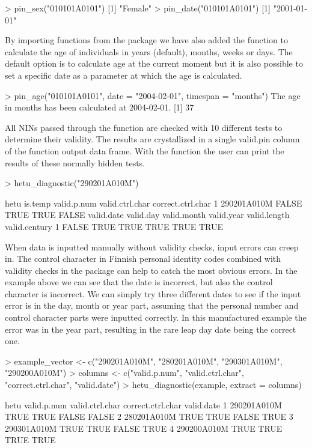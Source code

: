 \begin{example}
  > pin_sex("010101A0101")
  [1] "Female"
  > pin_date("010101A0101")
  [1] "2001-01-01"
\end{example}

By importing functions from the  package \citep{lubridate} we have also added the  function to calculate the age of individuals in years (default), months, weeks or days. The default option is to calculate age at the current moment but it is also possible to set a specific date as a parameter at which the age is calculated.

\begin{example}
  > pin_age("010101A0101", date = "2004-02-01", timespan = "months")
  The age in months has been calculated at 2004-02-01.
  [1] 37
\end{example}

All NINs passed through the  function are checked with 10 different tests to determine their validity. The results are crystallized in a single valid.pin column of the  function output data frame. With the  function the user can print the results of these normally hidden tests.

\begin{example}
  > hetu_diagnostic("290201A010M")
  
           hetu is.temp valid.p.num valid.ctrl.char correct.ctrl.char
  1 290201A010M   FALSE        TRUE            TRUE             FALSE
    valid.date valid.day valid.month valid.year valid.length valid.century
  1      FALSE      TRUE        TRUE       TRUE         TRUE          TRUE
\end{example}

When data is inputted manually without validity checks, input errors can creep in. The control character in Finnish personal identity codes combined with validity checks in the  package can help to catch the most obvious errors. In the example above we can see that the date is incorrect, but also the control character is incorrect. We can simply try three different dates to see if the input error is in the day, month or year part, assuming that the personal number and control character parts were inputted correctly. In this manufactured example the error was in the year part, resulting in the rare leap day date being the correct one.

\begin{example}
  > example_vector <- c("290201A010M", "280201A010M", "290301A010M", "290200A010M")
  > columns <- c("valid.p.num", "valid.ctrl.char", "correct.ctrl.char", "valid.date")
  > hetu_diagnostic(example, extract = columns)
  
           hetu valid.p.num valid.ctrl.char correct.ctrl.char valid.date
  1 290201A010M        TRUE            TRUE             FALSE      FALSE
  2 280201A010M        TRUE            TRUE             FALSE       TRUE
  3 290301A010M        TRUE            TRUE             FALSE       TRUE
  4 290200A010M        TRUE            TRUE              TRUE       TRUE
\end{example}

